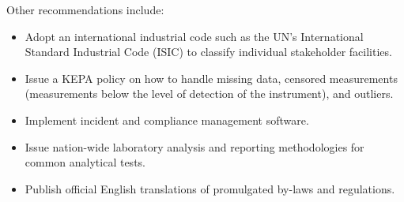 Other recommendations include:

\begin{itemize}
\item Adopt an international industrial code such as the UN's International Standard Industrial Code (ISIC) to classify individual stakeholder facilities.
\item Issue a KEPA policy on how to handle missing data, censored measurements (measurements below the level of detection of the instrument), and outliers.
\item Implement incident and compliance management software.
\item Issue nation-wide laboratory analysis and reporting methodologies for common analytical tests.
\item Publish official English translations of promulgated by-laws and regulations.

\end{itemize}




